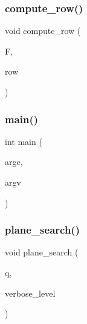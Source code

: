 \mbox{\label{plane__search_8_c_af945111d9c2dbe8ffc1478275c7d4d15}} 
\subsubsection{\texorpdfstring{compute\+\_\+row()}{compute\_row()}}
{\footnotesize\ttfamily void compute\+\_\+row (\begin{DoxyParamCaption}\item[{\mbox{\hyperlink{classfinite__field}{finite\+\_\+field}} $\ast$}]{F,  }\item[{\mbox{\hyperlink{galois_8h_a09fddde158a3a20bd2dcadb609de11dc}{I\+NT}}}]{row }\end{DoxyParamCaption})}

\mbox{\label{plane__search_8_c_a3c04138a5bfe5d72780bb7e82a18e627}} 
\subsubsection{\texorpdfstring{main()}{main()}}
{\footnotesize\ttfamily int main (\begin{DoxyParamCaption}\item[{int}]{argc,  }\item[{char $\ast$$\ast$}]{argv }\end{DoxyParamCaption})}

\mbox{\label{plane__search_8_c_a139312fcd3ab6cbe6643c4797ee21409}} 
\subsubsection{\texorpdfstring{plane\+\_\+search()}{plane\_search()}}
{\footnotesize\ttfamily void plane\+\_\+search (\begin{DoxyParamCaption}\item[{\mbox{\hyperlink{galois_8h_a09fddde158a3a20bd2dcadb609de11dc}{I\+NT}}}]{q,  }\item[{\mbox{\hyperlink{galois_8h_a09fddde158a3a20bd2dcadb609de11dc}{I\+NT}}}]{verbose\+\_\+level }\end{DoxyParamCaption})}


